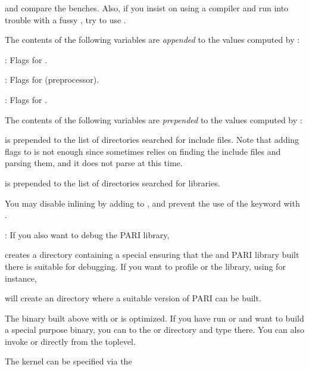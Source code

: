 
\noindent and compare the benches. Also, if you insist on using a 
compiler and run into trouble with a fussy , try to use
.


\noindent The contents of the following variables are \emph{appended} to the
values computed by :

: Flags for .

: Flags for  (preprocessor).

: Flags for .

\noindent The contents of the following variables are \emph{prepended} to
the values computed by :

 is prepended to the list of directories
searched for include files. Note that adding  flags to
 is not enough since  sometimes
relies on finding the include files and parsing them, and it does not
parse  at this time.

 is prepended to the list of directories
searched for libraries.

\noindent You may disable inlining by adding  to
, and prevent the use of the  keyword with
.

: If you also want to debug the PARI library,


\noindent creates a directory  containing a special
 ensuring that the  and PARI library built there is
suitable for debugging. If you want to
profile  or the library, using  for instance,


\noindent will create an  directory where a suitable version
of PARI can be built.

The  binary built above with  or  is
optimized. If you have run  or  and want to build
a special purpose binary, you can  to the  or 
directory and type  there. You can also invoke 
or  directly from the toplevel.

 The kernel can be specified via the

